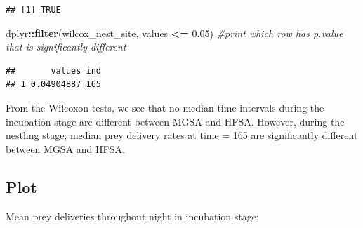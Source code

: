 \documentclass[]{article}
\newenvironment{Shaded}{\begin{snugshade}}{\end{snugshade}}
\newcommand{\CommentTok}[1]{\textcolor[rgb]{0.56,0.35,0.01}{\textit{#1}}}
\newcommand{\FloatTok}[1]{\textcolor[rgb]{0.00,0.00,0.81}{#1}}
\newcommand{\KeywordTok}[1]{\textcolor[rgb]{0.13,0.29,0.53}{\textbf{#1}}}
\newcommand{\NormalTok}[1]{#1}
\newcommand{\OperatorTok}[1]{\textcolor[rgb]{0.81,0.36,0.00}{\textbf{#1}}}
\newcommand{\StringTok}[1]{\textcolor[rgb]{0.31,0.60,0.02}{#1}}
\begin{document}
\begin{Shaded}
\end{Shaded}

\begin{verbatim}
## [1] TRUE
\end{verbatim}

\begin{Shaded}
\begin{Highlighting}[]
\NormalTok{dplyr}\OperatorTok{::}\KeywordTok{filter}\NormalTok{(wilcox_nest_site, values }\OperatorTok{<=}\StringTok{ }\FloatTok{0.05}\NormalTok{) }\CommentTok{#print which row has p.value that is significantly different}
\end{Highlighting}
\end{Shaded}

\begin{verbatim}
##       values ind
## 1 0.04904887 165
\end{verbatim}

From the Wilcoxon tests, we see that no median time intervals during the
incubation stage are different between MGSA and HFSA. However, during
the nestling stage, median prey delivery rates at time = 165 are
significantly different between MGSA and HFSA.

\hypertarget{plot-1}{%
\subsection{Plot}\label{plot-1}}

Mean prey deliveries throughout night in incubation stage:
\end{document}
